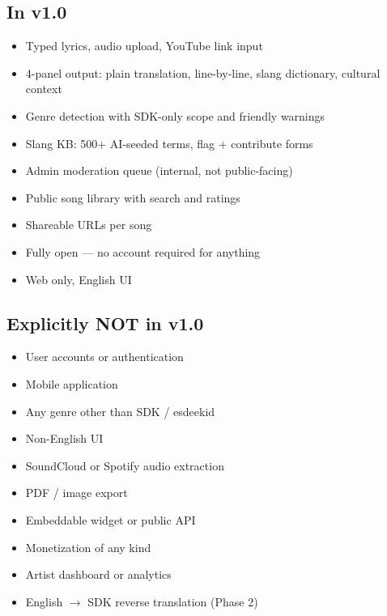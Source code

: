 \documentclass[12pt, a4paper]{article}
\begin{document}
\subsection*{In v1.0}
\begin{itemize}
  \item Typed lyrics, audio upload, YouTube link input
  \item 4-panel output: plain translation, line-by-line, slang dictionary,
        cultural context
  \item Genre detection with SDK-only scope and friendly warnings
  \item Slang KB: 500+ AI-seeded terms, flag + contribute forms
  \item Admin moderation queue (internal, not public-facing)
  \item Public song library with search and ratings
  \item Shareable URLs per song
  \item Fully open — no account required for anything
  \item Web only, English UI
\end{itemize}

\subsection*{Explicitly NOT in v1.0}
\begin{itemize}
  \item User accounts or authentication
  \item Mobile application
  \item Any genre other than SDK / esdeekid
  \item Non-English UI
  \item SoundCloud or Spotify audio extraction
  \item PDF / image export
  \item Embeddable widget or public API
  \item Monetization of any kind
  \item Artist dashboard or analytics
  \item English $\to$ SDK reverse translation (Phase 2)
\end{itemize}
\end{document}
